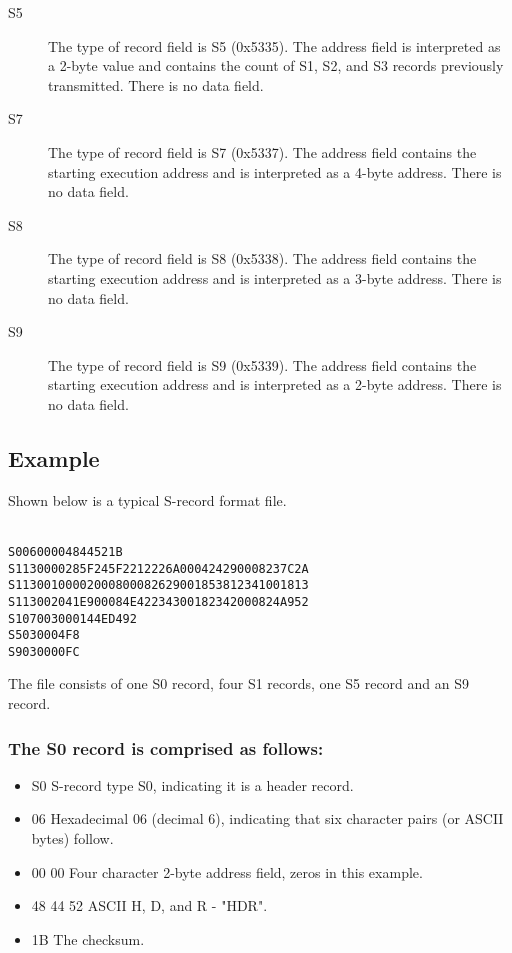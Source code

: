 \begin{description}
            \item[S5]
                The type of record field is S5 (0x5335). The address field is interpreted as a 2-byte value and contains the count of S1, S2, and S3 records previously transmitted. There is no data field.

            \item[S7]
                The type of record field is S7 (0x5337). The address field contains the starting execution address and is interpreted as a 4-byte address. There is no data field.

            \item[S8]
                The type of record field is S8 (0x5338). The address field contains the starting execution address and is interpreted as a 3-byte address. There is no data field.

            \item[S9]
                The type of record field is S9 (0x5339). The address field contains the starting execution address and is interpreted as a 2-byte address. There is no data field.
        \end{description}

    \subsection{Example}
        Shown below is a typical S-record format file.

        {
            \usecodefont
            \verb''\\
            \verb'S00600004844521B'\\
            \verb'S1130000285F245F2212226A000424290008237C2A'\\
            \verb'S11300100002000800082629001853812341001813'\\
            \verb'S113002041E900084E42234300182342000824A952'\\
            \verb'S107003000144ED492'\\
            \verb'S5030004F8'\\
            \verb'S9030000FC'\\
        }

        The file consists of one S0 record, four S1 records, one S5 record and an S9 record.

    \subsubsection{The S0 record is comprised as follows:}
        \begin{itemize}
            \item S0 S-record type S0, indicating it is a header record.
            \item 06 Hexadecimal 06 (decimal 6), indicating that six character pairs (or ASCII bytes) follow.
            \item 00 00 Four character 2-byte address field, zeros in this example.
            \item 48 44 52 ASCII H, D, and R - "HDR".
            \item 1B The checksum.
        \end{itemize}

